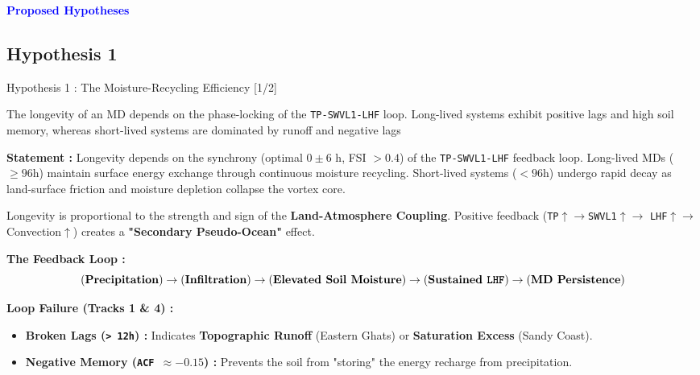 \begin{frame}
	\begin{center}
		\Huge \textcolor{blue}{\textbf{Proposed Hypotheses}} \\
	\end{center}
\end{frame}

\subsection{Hypothesis 1}
\begin{frame}{Hypothesis 1 : The Moisture-Recycling Efficiency [1/2]}
	\vspace{-0.1cm}
	\begin{block}{The longevity of an MD depends on the phase-locking of the \texttt{TP-SWVL1-LHF} loop. Long-lived systems exhibit positive lags and high soil memory, whereas short-lived systems are dominated by runoff and negative lags}\end{block}

	\vspace{0.15cm}
	\footnotesize
	\textbf{Statement :} Longevity depends on the synchrony (optimal $0 \pm 6$ h, FSI $>0.4$) of the \texttt{TP-SWVL1-LHF} feedback loop. Long-lived MDs ($\ge 96$h) maintain surface energy exchange through continuous moisture recycling. Short-lived systems ($< 96$h) undergo rapid decay as land-surface friction and moisture depletion collapse the vortex core.

	\vspace{0.2cm}
	\footnotesize
	Longevity is proportional to the strength and sign of the \textbf{Land-Atmosphere Coupling}. Positive feedback (\texttt{TP}$\uparrow \rightarrow$\texttt{SWVL1}$\uparrow \rightarrow$ \texttt{LHF}$\uparrow \rightarrow$ Convection$\uparrow$) creates a \textbf{"Secondary Pseudo-Ocean"} effect. \cite{hunt2017effect}

	\vspace{0.2cm}
	\footnotesize
	\textbf{The Feedback Loop :}
	\[ \text{(\textbf{Precipitation})} \rightarrow \text{(\textbf{Infiltration})} \rightarrow \text{(\textbf{Elevated Soil Moisture})} \rightarrow \text{(\textbf{Sustained \texttt{LHF}})} \rightarrow \text{(\textbf{MD Persistence})} \]

	\vspace{0.2cm}
	\footnotesize
	\textbf{Loop Failure (Tracks 1 \& 4) :}
	\begin{itemize}
		\item \textbf{Broken Lags (\texttt{> 12h}) :} Indicates \textbf{Topographic Runoff} (Eastern Ghats) or \textbf{Saturation Excess} (Sandy Coast).
		\item \textbf{Negative Memory (\texttt{ACF $\approx -0.15$}) :} Prevents the soil from "storing" the energy recharge from precipitation.
	\end{itemize}
\end{frame}


